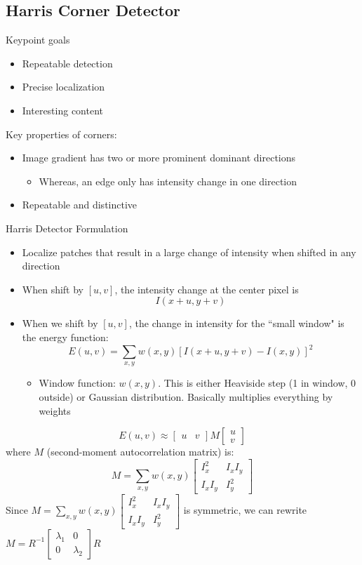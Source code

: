\subsection{Harris Corner Detector}
Keypoint goals
\begin{itemize}
    \item Repeatable detection
    \item Precise localization
    \item Interesting content
\end{itemize}
Key properties of corners:
\begin{itemize}
    \item Image gradient has two or more prominent dominant directions
    \begin{itemize}
        \item Whereas, an edge only has intensity change in one direction
    \end{itemize}
    \item Repeatable and distinctive
\end{itemize}
Harris Detector Formulation
\begin{itemize}
    \item Localize patches that result in a large change of intensity when shifted in any direction
    \item When shift by $[u,v]$, the intensity change at the center pixel is
    \[I(x+u,y+v)\]
    \item When we shift by $[u,v]$, the change in intensity for the ``small window" is the energy function:
    \[E(u,v)=\sum_{x,y} w(x,y) [I(x+u,y+v)-I(x,y)]^2\]
    \begin{itemize}
        \item Window function: $w(x,y)$. This is either Heaviside step (1 in window, 0 outside) or Gaussian distribution. Basically multiplies everything by weights
    \end{itemize}
\end{itemize}
\[E(u,v)\approx \begin{bmatrix}
    u&v
\end{bmatrix}M\begin{bmatrix}
    u\\v
\end{bmatrix}\]
where $M$ (second-moment autocorrelation matrix) is:
\[M=\sum_{x,y}w(x,y)\begin{bmatrix}
    I_x^2&I_xI_y\\I_xI_y&I_y^2
\end{bmatrix}\]
Since $M=\sum_{x,y}w(x,y)\begin{bmatrix}
    I_x^2&I_xI_y\\I_xI_y&I_y^2
\end{bmatrix}$ is symmetric, we can rewrite $M=R^{-1}\begin{bmatrix}
    \lambda_1 &0\\0&\lambda_2
\end{bmatrix}R$
